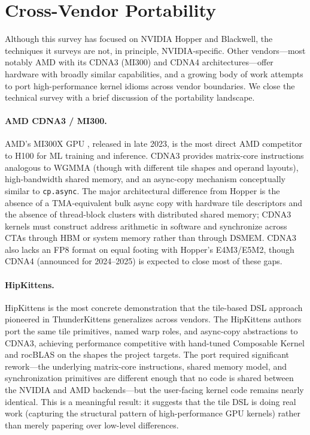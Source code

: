 \documentclass[10pt]{article}
\begin{document}
\section{Cross-Vendor Portability}
\label{sec:portability}

Although this survey has focused on NVIDIA Hopper and Blackwell, the techniques it surveys are not, in principle, NVIDIA-specific. Other vendors---most notably AMD with its CDNA3 (MI300) and CDNA4 architectures---offer hardware with broadly similar capabilities, and a growing body of work attempts to port high-performance kernel idioms across vendor boundaries. We close the technical survey with a brief discussion of the portability landscape.

\paragraph{AMD CDNA3 / MI300.}
AMD's MI300X GPU \citep{amd2023cdna3}, released in late 2023, is the most direct AMD competitor to H100 for ML training and inference. CDNA3 provides matrix-core instructions analogous to WGMMA (though with different tile shapes and operand layouts), high-bandwidth shared memory, and an async-copy mechanism conceptually similar to \texttt{cp.async}. The major architectural difference from Hopper is the absence of a TMA-equivalent bulk async copy with hardware tile descriptors and the absence of thread-block clusters with distributed shared memory; CDNA3 kernels must construct address arithmetic in software and synchronize across CTAs through HBM or system memory rather than through DSMEM. CDNA3 also lacks an FP8 format on equal footing with Hopper's E4M3/E5M2, though CDNA4 (announced for 2024--2025) is expected to close most of these gaps.

\paragraph{HipKittens.}
HipKittens \citep{hipkittens2025} is the most concrete demonstration that the tile-based DSL approach pioneered in ThunderKittens generalizes across vendors. The HipKittens authors port the same tile primitives, named warp roles, and async-copy abstractions to CDNA3, achieving performance competitive with hand-tuned Composable Kernel and rocBLAS on the shapes the project targets. The port required significant rework---the underlying matrix-core instructions, shared memory model, and synchronization primitives are different enough that no code is shared between the NVIDIA and AMD backends---but the user-facing kernel code remains nearly identical. This is a meaningful result: it suggests that the tile DSL is doing real work (capturing the structural pattern of high-performance GPU kernels) rather than merely papering over low-level differences.
\end{document}
